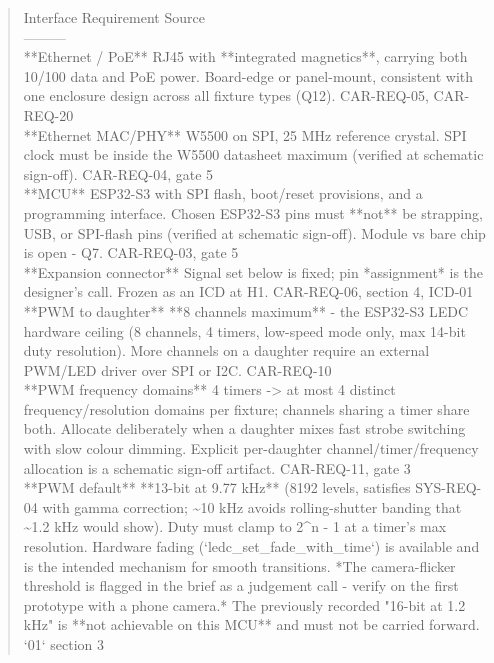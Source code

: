 \documentclass[11pt,a4paper]{article}
\begin{document}
\begin{quote}\small\ttfamily\raggedright
\textbar{} Interface \textbar{} Requirement \textbar{} Source \textbar{}\\
\textbar{}---\textbar{}---\textbar{}---\textbar{}\\
\textbar{} {*}{*}Ethernet / PoE{*}{*} \textbar{} RJ45 with {*}{*}integrated magnetics{*}{*}, carrying both 10/100 data and PoE power. Board-edge or panel-mount, consistent with one enclosure design across all fixture types (Q12). \textbar{} CAR-REQ-05, CAR-REQ-20 \textbar{}\\
\textbar{} {*}{*}Ethernet MAC/PHY{*}{*} \textbar{} W5500 on SPI, 25 MHz reference crystal. SPI clock must be inside the W5500 datasheet maximum (verified at schematic sign-off). \textbar{} CAR-REQ-04, gate 5 \textbar{}\\
\textbar{} {*}{*}MCU{*}{*} \textbar{} ESP32-S3 with SPI flash, boot/reset provisions, and a programming interface. Chosen ESP32-S3 pins must {*}{*}not{*}{*} be strapping, USB, or SPI-flash pins (verified at schematic sign-off). Module vs bare chip is open - Q7. \textbar{} CAR-REQ-03, gate 5 \textbar{}\\
\textbar{} {*}{*}Expansion connector{*}{*} \textbar{} Signal set below is fixed; pin {*}assignment{*} is the designer's call. Frozen as an ICD at H1. \textbar{} CAR-REQ-06, section 4, ICD-01 \textbar{}\\
\textbar{} {*}{*}PWM to daughter{*}{*} \textbar{} {*}{*}8 channels maximum{*}{*} - the ESP32-S3 LEDC hardware ceiling (8 channels, 4 timers, low-speed mode only, max 14-bit duty resolution). More channels on a daughter require an external PWM/LED driver over SPI or I2C. \textbar{} CAR-REQ-10 \textbar{}\\
\textbar{} {*}{*}PWM frequency domains{*}{*} \textbar{} 4 timers -\textgreater{} at most 4 distinct frequency/resolution domains per fixture; channels sharing a timer share both. Allocate deliberately when a daughter mixes fast strobe switching with slow colour dimming. Explicit per-daughter channel/timer/frequency allocation is a schematic sign-off artifact. \textbar{} CAR-REQ-11, gate 3 \textbar{}\\
\textbar{} {*}{*}PWM default{*}{*} \textbar{} {*}{*}13-bit at 9.77 kHz{*}{*} (8192 levels, satisfies SYS-REQ-04 with gamma correction; \textasciitilde{}10 kHz avoids rolling-shutter banding that \textasciitilde{}1.2 kHz would show). Duty must clamp to 2\textasciicircum{}n - 1 at a timer's max resolution. Hardware fading (`ledc\_set\_fade\_with\_time`) is available and is the intended mechanism for smooth transitions. {*}The camera-flicker threshold is flagged in the brief as a judgement call - verify on the first prototype with a phone camera.{*} The previously recorded "16-bit at 1.2 kHz" is {*}{*}not achievable on this MCU{*}{*} and must not be carried forward. \textbar{} `01` section 3 \textbar{}\\

\end{quote}
\end{document}
